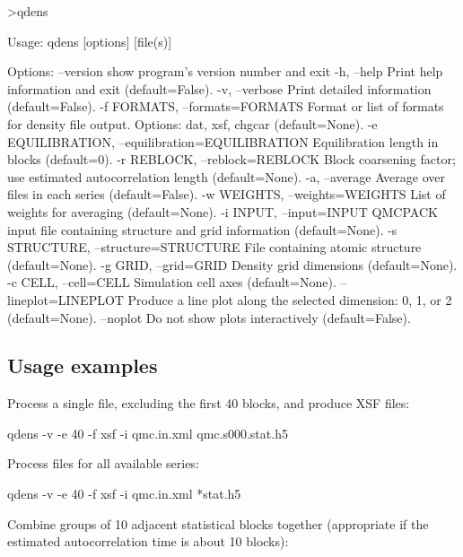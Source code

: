 \begin{shade}
>qdens

Usage: qdens [options] [file(s)]

Options:
  --version             show program's version number and exit
  -h, --help            Print help information and exit (default=False).
  -v, --verbose         Print detailed information (default=False).
  -f FORMATS, --formats=FORMATS
                        Format or list of formats for density file output.
                        Options: dat, xsf, chgcar (default=None).
  -e EQUILIBRATION, --equilibration=EQUILIBRATION
                        Equilibration length in blocks (default=0).
  -r REBLOCK, --reblock=REBLOCK
                        Block coarsening factor; use estimated autocorrelation
                        length (default=None).
  -a, --average         Average over files in each series (default=False).
  -w WEIGHTS, --weights=WEIGHTS
                        List of weights for averaging (default=None).
  -i INPUT, --input=INPUT
                        QMCPACK input file containing structure and grid
                        information (default=None).
  -s STRUCTURE, --structure=STRUCTURE
                        File containing atomic structure (default=None).
  -g GRID, --grid=GRID  Density grid dimensions (default=None).
  -c CELL, --cell=CELL  Simulation cell axes (default=None).
  --lineplot=LINEPLOT   Produce a line plot along the selected dimension: 0,
                        1, or 2 (default=None).
  --noplot              Do not show plots interactively (default=False).

\end{shade}


\subsection{Usage examples}

Process a single file, excluding the first 40 blocks, and produce XSF files:

\begin{shade}
  qdens -v -e 40 -f xsf -i qmc.in.xml qmc.s000.stat.h5
\end{shade}

Process files for all available series:

\begin{shade}
  qdens -v -e 40 -f xsf -i qmc.in.xml *stat.h5
\end{shade}

Combine groups of 10 adjacent statistical blocks together (appropriate if the 
estimated autocorrelation time is about 10 blocks): 

